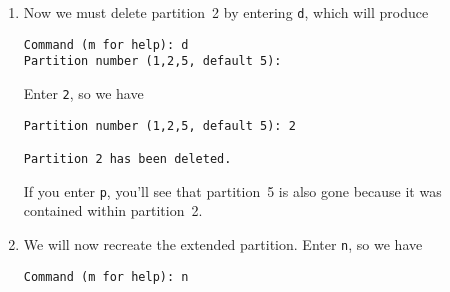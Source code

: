 \documentclass[12pt,letterpaper]{article}
\begin{document}
\begin{enumerate}
The first partition is the boot partition.  The second is an extended partition used to overcome the 4~primary partition limit.  The third partition---that is, partition~5---is contained within partition~2, and holds only \SI{849.5}{\mebi\byte}\footnote{%
%
Note the distinction between \si{\mebi\byte} (1~mebibyte \(=1024\cdot1024\) bytes) and \si{\mega\byte} (1 megabyte \(=10^6\) bytes).  I've tried to be consistent in this document, but mistakes have a way of creeping in, and it's ultimately not terribly important.}, which is only a fraction of the disk's available space.

\item Now we must delete partition~2 by entering \lstinline{d}, which will produce

\begin{lstlisting}
Command (m for help): d
Partition number (1,2,5, default 5):
\end{lstlisting}
Enter \lstinline{2}, so we have

\begin{lstlisting}
Partition number (1,2,5, default 5): 2

Partition 2 has been deleted.
\end{lstlisting}

If you enter \lstinline{p}, you'll see that partition~5 is also gone because it was contained within partition~2.

\item We will now recreate the extended partition.  Enter \lstinline{n}, so we have

\begin{lstlisting}
Command (m for help): n


\end{lstlisting}
\end{enumerate}
\end{document}
